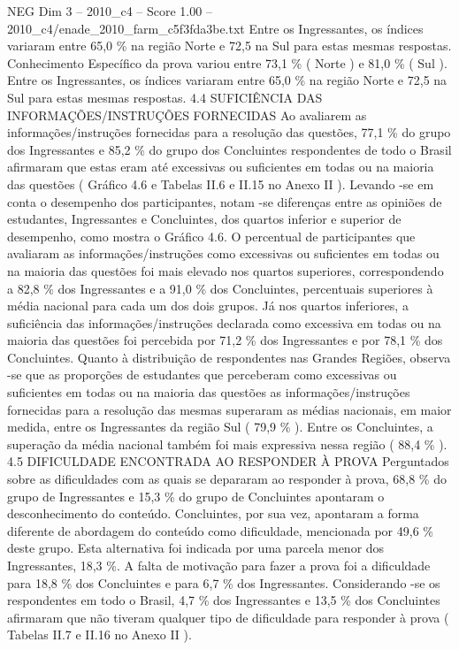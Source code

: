\begin{textsample}{NEG Dim 3 – 2010\_c4 – Score 1.00 – 2010\_c4/enade\_2010\_farm\_c5f3fda3be.txt}
Entre os Ingressantes, os índices variaram entre 65,0 \% na região Norte e 72,5 na Sul para estas mesmas respostas.
Conhecimento Específico da prova variou entre 73,1 \% ( Norte ) e 81,0 \% ( Sul ).
Entre os Ingressantes, os índices variaram entre 65,0 \% na região Norte e 72,5 na Sul para estas mesmas respostas. 4.4 SUFICIÊNCIA DAS INFORMAÇÕES/INSTRUÇÕES FORNECIDAS Ao avaliarem as informações/instruções fornecidas para a resolução das questões, 77,1 \% do grupo dos Ingressantes e 85,2 \% do grupo dos Concluintes respondentes de todo o Brasil afirmaram que estas eram até excessivas ou suficientes em todas ou na maioria das questões ( Gráfico 4.6 e Tabelas II.6 e II.15 no Anexo II ).
Levando -se em conta o desempenho dos participantes, notam -se diferenças entre as opiniões de estudantes, Ingressantes e Concluintes, dos quartos inferior e superior de desempenho, como mostra o Gráfico 4.6.
O percentual de participantes que avaliaram as informações/instruções como excessivas ou suficientes em todas ou na maioria das questões foi mais elevado nos quartos superiores, correspondendo a 82,8 \% dos Ingressantes e a 91,0 \% dos Concluintes, percentuais superiores à média nacional para cada um dos dois grupos.
Já nos quartos inferiores, a suficiência das informações/instruções declarada como excessiva em todas ou na maioria das questões foi percebida por 71,2 \% dos Ingressantes e por 78,1 \% dos Concluintes.
Quanto à distribuição de respondentes nas Grandes Regiões, observa -se que as proporções de estudantes que perceberam como excessivas ou suficientes em todas ou na maioria das questões as informações/instruções fornecidas para a resolução das mesmas superaram as médias nacionais, em maior medida, entre os Ingressantes da região Sul ( 79,9 \% ).
Entre os Concluintes, a superação da média nacional também foi mais expressiva nessa região ( 88,4 \% ). 4.5 DIFICULDADE ENCONTRADA AO RESPONDER À PROVA Perguntados sobre as dificuldades com as quais se depararam ao responder à prova, 68,8 \% do grupo de Ingressantes e 15,3 \% do grupo de Concluintes apontaram o desconhecimento do conteúdo.
Concluintes, por sua vez, apontaram a forma diferente de abordagem do conteúdo como dificuldade, mencionada por 49,6 \% deste grupo.
Esta alternativa foi indicada por uma parcela menor dos Ingressantes, 18,3 \%.
A falta de motivação para fazer a prova foi a dificuldade para 18,8 \% dos Concluintes e para 6,7 \% dos Ingressantes.
Considerando -se os respondentes em todo o Brasil, 4,7 \% dos Ingressantes e 13,5 \% dos Concluintes afirmaram que não tiveram qualquer tipo de dificuldade para responder à prova ( Tabelas II.7 e II.16 no Anexo II ).

\end{textsample}
